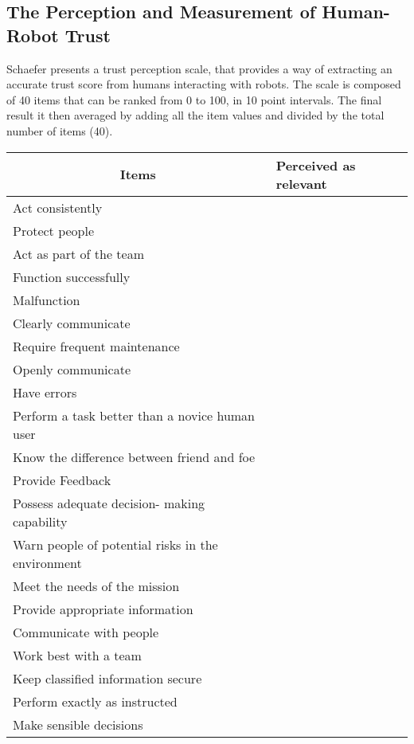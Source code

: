 \subsection{The Perception and Measurement of Human-Robot Trust}

Schaefer\cite{Schaefer2009} presents a trust perception scale, that provides a way of extracting an accurate trust score from humans interacting with robots. The scale is composed of 40 items that can be ranked from 0 to 100, in 10 point intervals. The final result it then averaged by adding all the item values and divided by the total number of items (40).

\begin{table}[p]
	\centering
	\begin{tabular}{p{5cm}|l}
		\multicolumn{1}{c|}{Items} & Perceived as relevant \\ \hline
		Act consistently & \\ \hline
		Protect people & \\ \hline
		Act as part of the team & \\ \hline
		Function successfully & \\ \hline
		Malfunction & \\ \hline
		Clearly communicate & \\ \hline
		Require frequent maintenance & \\ \hline
		Openly communicate & \\ \hline
		Have errors & \\ \hline
		Perform a task better than a novice human user & \\ \hline
		Know the difference between friend and foe & \\ \hline
		Provide Feedback & \\ \hline
		Possess adequate decision- making capability & \\ \hline
		Warn people of potential risks in the environment & \\ \hline
		Meet the needs of the mission & \\ \hline
		Provide appropriate information & \\ \hline
		Communicate with people & \\ \hline
		Work best with a team & \\ \hline
		Keep classified information secure & \\ \hline
		Perform exactly as instructed & \\ \hline
		Make sensible decisions & \\ \hline

\end{tabular}
\end{table}
